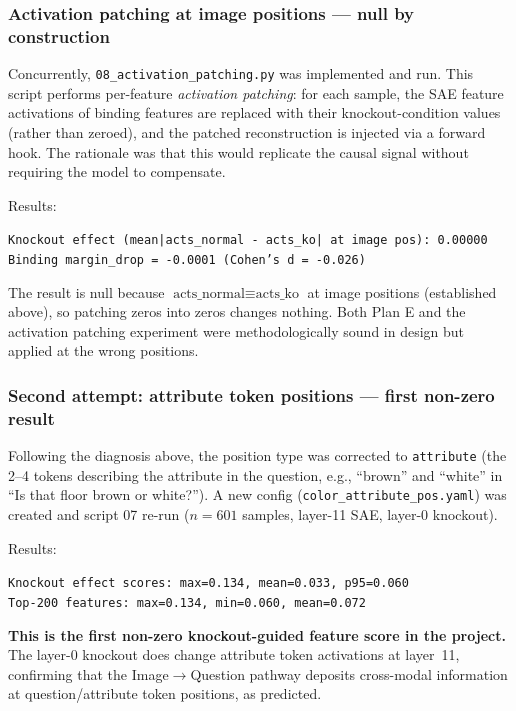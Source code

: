 \documentclass[11pt,a4paper]{article}
\begin{document}
\subsubsection{Activation patching at image positions — null by construction}

Concurrently, \texttt{08\_activation\_patching.py} was implemented and run.
This script performs per-feature \emph{activation patching}: for each sample, the SAE feature
activations of binding features are replaced with their knockout-condition values (rather than
zeroed), and the patched reconstruction is injected via a forward hook.
The rationale was that this would replicate the causal signal without requiring the model to compensate.

Results:
\begin{center}
\texttt{Knockout effect (mean|acts\_normal - acts\_ko| at image pos): 0.00000}\\
\texttt{Binding margin\_drop = -0.0001 (Cohen's d = -0.026)}
\end{center}

The result is null because $\text{acts\_normal} \equiv \text{acts\_ko}$ at image positions
(established above), so patching zeros into zeros changes nothing.
Both Plan E and the activation patching experiment were methodologically sound in design but
applied at the wrong positions.

\subsubsection{Second attempt: attribute token positions — first non-zero result}
\label{sec:plan_e_attribute}

Following the diagnosis above, the position type was corrected to \texttt{attribute}
(the 2--4 tokens describing the attribute in the question, e.g., ``brown'' and ``white'' in
``Is that floor brown or white?'').
A new config (\texttt{color\_attribute\_pos.yaml}) was created and script 07 re-run
($n = 601$ samples, layer-11 SAE, layer-0 knockout).

Results:
\begin{center}
\texttt{Knockout effect scores: max=0.134, mean=0.033, p95=0.060}\\
\texttt{Top-200 features: max=0.134, min=0.060, mean=0.072}
\end{center}

\textbf{This is the first non-zero knockout-guided feature score in the project.}
The layer-0 knockout does change attribute token activations at layer~11, confirming that the
Image$\to$Question pathway deposits cross-modal information at question/attribute token positions,
as predicted.
\end{document}

